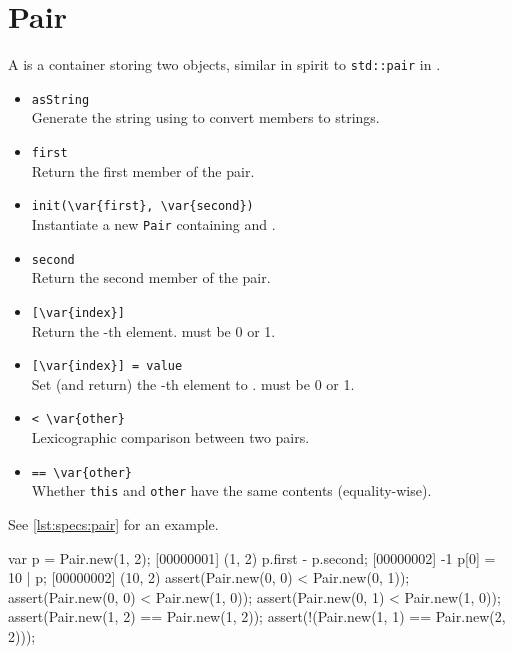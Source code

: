 \section{Pair}

A  is a container storing two objects, similar in spirit to
\lstinline|std::pair| in \Cxx.


\begin{itemize}
\item \lstinline|asString|\\
  Generate the string  using
   to convert members to strings.

\item \lstinline|first|\\
  Return the first member of the pair.

\item \lstinline|init(\var{first}, \var{second})|~\\
  Instantiate a new \lstinline|Pair| containing  and
  .

\item \lstinline|second|\\
  Return the second member of the pair.

\item \lstinline|[\var{index}]|\\
  Return the -th element.   must be 0 or 1.

\item \lstinline|[\var{index}] = value|\\
  Set (and return) the -th element to .
   must be 0 or 1.

\item \lstinline|< \var{other}|\\
  Lexicographic comparison between two pairs.

\item \lstinline|== \var{other}|\\
  Whether \lstinline|this| and \lstinline|other| have the same
  contents (equality-wise).
\end{itemize}

See \autoref{lst:specs:pair} for an example.

\begin{urbiscript}[caption=Pairs, label=lst:specs:pair]
var p = Pair.new(1, 2);
[00000001] (1, 2)
p.first - p.second;
[00000002] -1
p[0] = 10 | p;
[00000002] (10, 2)
assert(Pair.new(0, 0) < Pair.new(0, 1));
assert(Pair.new(0, 0) < Pair.new(1, 0));
assert(Pair.new(0, 1) < Pair.new(1, 0));
assert(Pair.new(1, 2) == Pair.new(1, 2));
assert(!(Pair.new(1, 1) == Pair.new(2, 2)));
\end{urbiscript}


